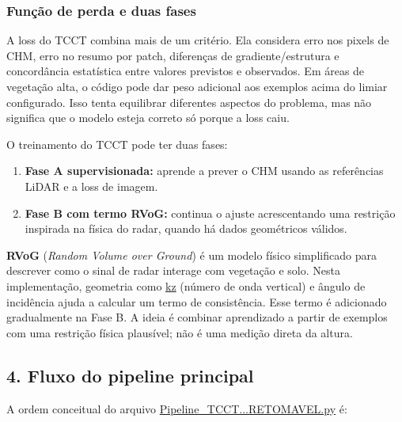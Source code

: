 \documentclass[11pt,a4paper]{article}
\begin{document}
\subsubsection{Função de perda e duas fases}
A loss do TCCT combina mais de um critério. Ela considera erro nos pixels de CHM, erro no resumo por patch, diferenças de gradiente/estrutura e concordância estatística entre valores previstos e observados. Em áreas de vegetação alta, o código pode dar peso adicional aos exemplos acima do limiar configurado. Isso tenta equilibrar diferentes aspectos do problema, mas não significa que o modelo esteja correto só porque a loss caiu.

O treinamento do TCCT pode ter duas fases:

\begin{enumerate}
\item \textbf{Fase A supervisionada:} aprende a prever o CHM usando as referências LiDAR e a loss de imagem.
\item \textbf{Fase B com termo RVoG:} continua o ajuste acrescentando uma restrição inspirada na física do radar, quando há dados geométricos válidos.
\end{enumerate}
\textbf{RVoG} (\emph{Random Volume over Ground}) é um modelo físico simplificado para descrever como o sinal de radar interage com vegetação e solo. Nesta implementação, geometria como \url{kz} (número de onda vertical) e ângulo de incidência ajuda a calcular um termo de consistência. Esse termo é adicionado gradualmente na Fase B. A ideia é combinar aprendizado a partir de exemplos com uma restrição física plausível; não é uma medição direta da altura.

\subsection{4. Fluxo do pipeline principal}
A ordem conceitual do arquivo \url{Pipeline_TCCT...RETOMAVEL.py} é:
\end{document}
